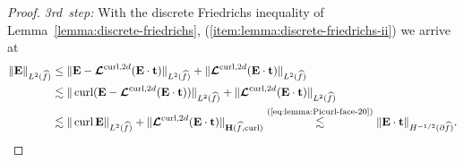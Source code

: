 \documentclass{article}
\begin{document}
\begin{proof}
\emph{3rd~step:} With the discrete Friedrichs inequality of
Lemma~\ref{lemma:discrete-friedrichs},
(\ref{item:lemma:discrete-friedrichs-ii}) we arrive at
\begin{align}
\label{eq:lemma:Picurl-face-30}
\Vert{\mathbf{E}}\Vert_{L^{2}(\widehat{f})}  
&  \leq\Vert{\mathbf{E}}-\boldsymbol{\mathcal{L}%
}^{\operatorname*{curl},2d}({\mathbf{E}}\cdot\mathbf{t})\Vert_{L^{2}(\widehat{f})}%
+\Vert\boldsymbol{\mathcal{L}}^{\operatorname*{curl},2d}({\mathbf{E}}\cdot\mathbf{t})\Vert
_{L^{2}(\widehat{f})}\\
& \lesssim\Vert\operatorname{curl}({\mathbf{E}}-\boldsymbol{\mathcal{L}%
}^{\operatorname*{curl},2d}({\mathbf{E}}\cdot\mathbf{t}))\Vert_{L^{2}(\widehat{f})}%
+\Vert\boldsymbol{\mathcal{L}}^{\operatorname*{curl},2d}({\mathbf{E}}\cdot\mathbf{t})\Vert
_{L^{2}(\widehat{f})}\nonumber \\
&  \lesssim\Vert\operatorname{curl}{\mathbf{E}}\Vert_{L^{2}(\widehat{f})}%
+\Vert\boldsymbol{\mathcal{L}}^{\operatorname*{curl},2d}({\mathbf{E}}\cdot\mathbf{t})\Vert_{\mathbf{H}(\widehat{f},\operatorname{curl})}\overset{\text{(\ref{eq:lemma:Picurl-face-20}%
)}}{\lesssim}\Vert{\mathbf{E}}\cdot\mathbf{t}\Vert_{H^{-1/2}(\partial \widehat{f})}.
\nonumber 
\end{align}


\end{proof}
\end{document}
